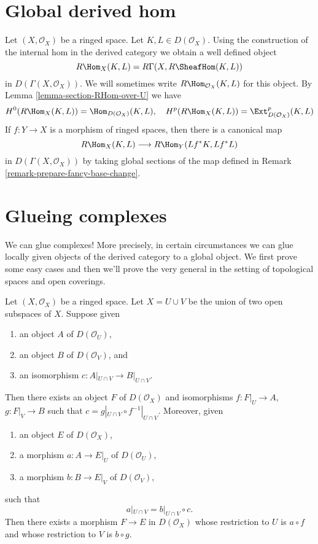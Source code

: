 \section{Global derived hom}
\label{section-global-RHom}

\noindent
Let $(X, \mathcal{O}_X)$ be a ringed space. Let $K, L \in D(\mathcal{O}_X)$.
Using the construction of the internal hom in the derived category we
obtain a well defined object
$$
R\Hom_X(K, L) = R\Gamma(X, R\SheafHom(K, L))
$$
in $D(\Gamma(X, \mathcal{O}_X))$. We will sometimes write
$R\Hom_{\mathcal{O}_X}(K, L)$ for this object.
By Lemma \ref{lemma-section-RHom-over-U}
we have
$$
H^0(R\Hom_X(K, L)) = \Hom_{D(\mathcal{O}_X)}(K, L),
\quad
H^p(R\Hom_X(K, L)) = \Ext_{D(\mathcal{O}_X)}^p(K, L)
$$
If $f : Y \to X$ is a morphism of ringed spaces, then there is
a canonical map
$$
R\Hom_X(K, L) \longrightarrow R\Hom_Y(Lf^*K, Lf^*L)
$$
in $D(\Gamma(X, \mathcal{O}_X))$ by taking global sections of the map
defined in Remark \ref{remark-prepare-fancy-base-change}.








\section{Glueing complexes}
\label{section-glueing-complexes}

\noindent
We can glue complexes! More precisely, in certain circumstances we can
glue locally given objects of the derived category to a global object.
We first prove some easy cases and then we'll prove the very general
\cite[Theorem 3.2.4]{BBD}
in the setting of topological spaces and open coverings.

\begin{lemma}
\label{lemma-glue}
Let $(X, \mathcal{O}_X)$ be a ringed space. Let $X = U \cup V$ be
the union of two open subspaces of $X$. Suppose given
\begin{enumerate}
\item an object $A$ of $D(\mathcal{O}_U)$,
\item an object $B$ of $D(\mathcal{O}_V)$, and
\item an isomorphism $c : A|_{U \cap V} \to B|_{U \cap V}$.
\end{enumerate}
Then there exists an object $F$ of $D(\mathcal{O}_X)$
and isomorphisms $f : F|_U \to A$, $g : F|_V \to B$ such
that $c = g|_{U \cap V} \circ f^{-1}|_{U \cap V}$.
Moreover, given
\begin{enumerate}
\item an object $E$ of $D(\mathcal{O}_X)$,
\item a morphism $a : A \to E|_U$ of $D(\mathcal{O}_U)$,
\item a morphism $b : B \to E|_V$ of $D(\mathcal{O}_V)$, 
\end{enumerate}
such that
$$
a|_{U \cap V}  = b|_{U \cap V} \circ c.
$$
Then there exists a morphism $F \to E$ in $D(\mathcal{O}_X)$
whose restriction to $U$ is $a \circ f$
and whose restriction to $V$ is $b \circ g$.
\end{lemma}

